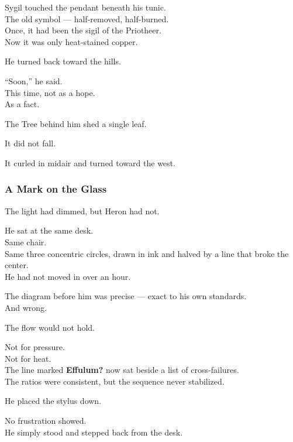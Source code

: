 \documentclass[12pt]{article}
\begin{document}
\vspace{1em}

Sygil touched the pendant beneath his tunic.\\
The old symbol — half-removed, half-burned.\\
Once, it had been the sigil of the Priotheer.\\
Now it was only heat-stained copper.

He turned back toward the hills.

“Soon,” he said.\\
This time, not as a hope.\\
As a fact.

\vspace{1em}

The Tree behind him shed a single leaf.

It did not fall.

It curled in midair and turned toward the west.

\dotfill

\subsubsection{A Mark on the Glass}

The light had dimmed, but Heron had not.

He sat at the same desk.\\
Same chair.\\
Same three concentric circles, drawn in ink and halved by a line that broke the center.\\
He had not moved in over an hour.

The diagram before him was precise — exact to his own standards.\\
And wrong.

\vspace{1em}

The flow would not hold.

Not for pressure.\\
Not for heat.\\
The line marked \textbf{Effulum?} now sat beside a list of cross-failures.\\
The ratios were consistent, but the sequence never stabilized.

\vspace{1em}

He placed the stylus down.

No frustration showed.\\
He simply stood and stepped back from the desk.
\end{document}
